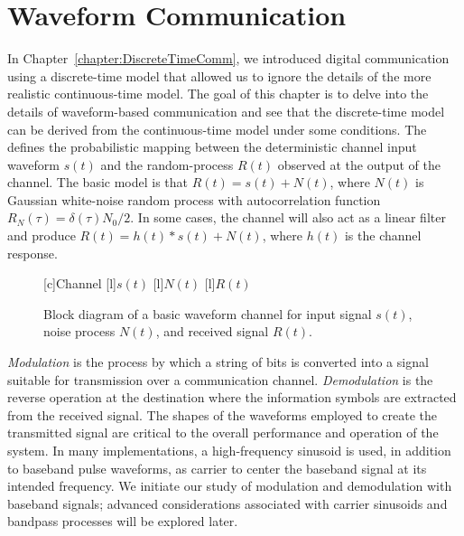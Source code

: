 \chapter{Waveform Communication}
\label{chapter:ContinuousTimeComm}

In Chapter~\ref{chapter:DiscreteTimeComm}, we introduced digital communication using a discrete-time model that allowed us to ignore the details of the more realistic continuous-time model.
The goal of this chapter is to delve into the details of waveform-based communication and see that the discrete-time model can be derived from the continuous-time model under some conditions.
The  defines the probabilistic mapping between the deterministic channel input waveform $s(t)$ and the random-process $R(t)$ observed at the output of the channel.
The basic model is that $R(t) = s(t) + N(t)$, where $N(t)$ is Gaussian white-noise random process with autocorrelation function $R_N (\tau) = \delta(\tau) N_0 / 2$.
In some cases, the channel will also act as a linear filter and produce $R(t) = h(t) * s(t) + N(t)$, where $h(t)$ is the channel response.

\begin{figure}
\begin{center}
\begin{psfrags}
[c]{Channel}
[l]{$s(t)$}
[l]{$N(t)$}
[l]{$R(t)$}
\end{psfrags}
\end{center}
\caption{Block diagram of a basic waveform channel for input signal $s(t)$, noise process $N(t)$, and received signal $R(t)$.}
\end{figure}

\iffalse
\emph{Modulation} is the process by which a string of bits is converted into a signal suitable for transmission over a communication channel.
\emph{Demodulation} is the reverse operation at the destination where the information symbols are extracted from the received signal.
The shapes of the waveforms employed to create the transmitted signal are critical to the overall performance and operation of the system.
In many implementations, a high-frequency sinusoid is used, in addition to baseband pulse waveforms, as carrier to center the baseband signal at its intended frequency.
We initiate our study of modulation and demodulation with baseband signals; advanced considerations associated with carrier sinusoids and bandpass processes will be explored later.

